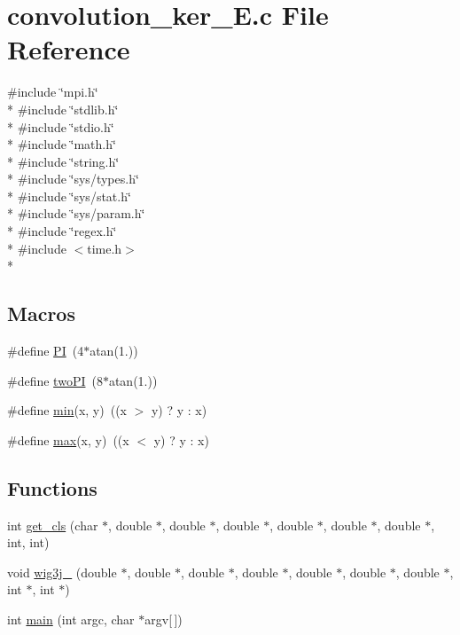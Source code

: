 \section{convolution\-\_\-ker\-\_\-\-E.\-c File Reference}
\label{convolution__ker__E_8c}
{\ttfamily \#include \char`\"{}mpi.\-h\char`\"{}}\\*
{\ttfamily \#include \char`\"{}stdlib.\-h\char`\"{}}\\*
{\ttfamily \#include \char`\"{}stdio.\-h\char`\"{}}\\*
{\ttfamily \#include \char`\"{}math.\-h\char`\"{}}\\*
{\ttfamily \#include \char`\"{}string.\-h\char`\"{}}\\*
{\ttfamily \#include \char`\"{}sys/types.\-h\char`\"{}}\\*
{\ttfamily \#include \char`\"{}sys/stat.\-h\char`\"{}}\\*
{\ttfamily \#include \char`\"{}sys/param.\-h\char`\"{}}\\*
{\ttfamily \#include \char`\"{}regex.\-h\char`\"{}}\\*
{\ttfamily \#include $<$time.\-h$>$}\\*
\subsection*{Macros}
\begin{DoxyCompactItemize}
\item 
\#define \hyperlink{convolution__ker__E_8c_a598a3330b3c21701223ee0ca14316eca}{P\-I}~(4$\ast$atan(1.))
\item 
\#define \hyperlink{convolution__ker__E_8c_a0a3527f8b23535fe43972fbe88c3cc0d}{two\-P\-I}~(8$\ast$atan(1.))
\item 
\#define \hyperlink{convolution__ker__E_8c_abb702d8b501669a23aa0ab3b281b9384}{min}(x, y)~((x $>$ y) ? y \-: x)
\item 
\#define \hyperlink{convolution__ker__E_8c_ac39d9cef6a5e030ba8d9e11121054268}{max}(x, y)~((x $<$ y) ? y \-: x)
\end{DoxyCompactItemize}
\subsection*{Functions}
\begin{DoxyCompactItemize}
\item 
int \hyperlink{convolution__ker__E_8c_add70c5428ae7e81c41c4c2360eb60543}{get\-\_\-cls} (char $\ast$, double $\ast$, double $\ast$, double $\ast$, double $\ast$, double $\ast$, double $\ast$, int, int)
\item 
void \hyperlink{convolution__ker__E_8c_af06278380393e21ff3f1bf4db83834b4}{wig3j\-\_\-} (double $\ast$, double $\ast$, double $\ast$, double $\ast$, double $\ast$, double $\ast$, double $\ast$, int $\ast$, int $\ast$)
\item 
int \hyperlink{convolution__ker__E_8c_a0ddf1224851353fc92bfbff6f499fa97}{main} (int argc, char $\ast$argv\mbox{[}$\,$\mbox{]})
\end{DoxyCompactItemize}


